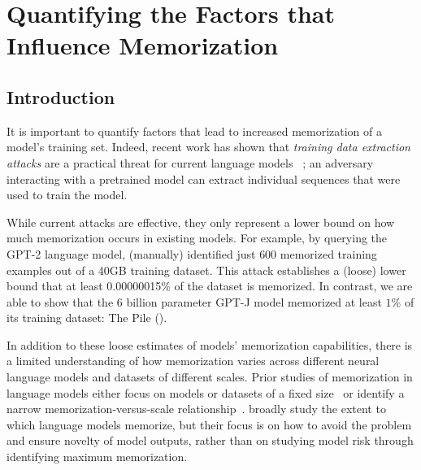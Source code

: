 \section{Quantifying the Factors that Influence Memorization}
\label{section:quantifying_memorization}

\subsection{Introduction}

It is important to  quantify factors that lead to increased memorization of a model's training set.
%
Indeed, recent work has shown that \emph{training data extraction attacks} are a practical threat for current language models ~\citep{carlini2020extracting};
an adversary interacting with a pretrained model can extract individual
sequences that were used to train the model.

While current attacks are effective, they only represent a lower bound on how much memorization occurs in existing models.
%
For example, by querying
the GPT-2 language model, \citet{carlini2020extracting} (manually) identified just $600$ memorized training examples out of a $40$GB training dataset.
%
This attack establishes a (loose) lower bound that at least
0.00000015\%
of the dataset is memorized. %
% 
In contrast, we are able to show that the 6 billion parameter 
GPT-J model \citep{gpt-neo,gpt-j} memorized at least $1\%$ of its training dataset: The Pile (\cite{gao2020pile}).

In addition to these loose estimates of models' memorization capabilities, there is a limited understanding of how memorization varies across different neural language models and datasets of different scales.
%
Prior studies of memorization in language models either focus on models or datasets of a fixed size~\citep{carlini2019secret, zhang2021counterfactual, thakkar2020understanding} or identify a narrow memorization-versus-scale relationship~\citep{carlini2020extracting, lee2021deduplicating}.
\citet{mccoy2021raven} broadly study the extent to which language models memorize, but their focus is on how to avoid the problem and ensure novelty of model outputs, rather than on studying model risk through identifying maximum memorization.

